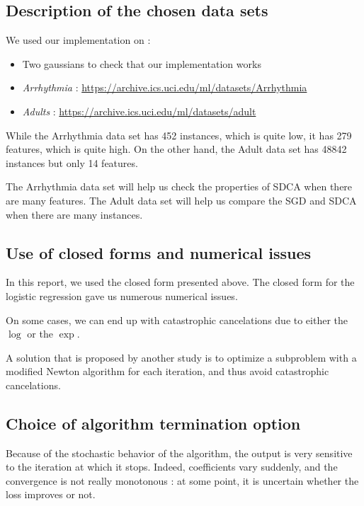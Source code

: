 \documentclass{article}
\begin{document}
\subsection{Description of the chosen data sets}

We used our implementation on :

\begin{itemize}
	\item Two gaussians to check that our implementation works
	\item \textit{Arrhythmia} : \url{https://archive.ics.uci.edu/ml/datasets/Arrhythmia}
	\item \textit{Adults} : \url{https://archive.ics.uci.edu/ml/datasets/adult}
\end{itemize}

While the Arrhythmia data set has 452 instances, which is quite low, it has 279 features, which is quite high.
On the other hand, the Adult data set has 48842 instances but only 14 features.

The Arrhythmia data set will help us check the properties of SDCA when there are many features.
The Adult data set will help us compare the SGD and SDCA when there are many instances.

\subsection{Use of closed forms and numerical issues}

In this report, we used the closed form presented above.
The closed form for the logistic regression gave us numerous numerical issues.

On some cases, we can end up with catastrophic cancelations due to either the $\log$ or the $\exp$.

A solution that is proposed by another study is to optimize a subproblem with a modified Newton algorithm for each iteration, and thus avoid catastrophic cancelations.

\subsection{Choice of algorithm termination option}

Because of the stochastic behavior of the algorithm, the output is very sensitive to the iteration at which it stops.
Indeed, coefficients vary suddenly, and the convergence is not really monotonous : at some point, it is uncertain whether the loss improves or not.
\end{document}
